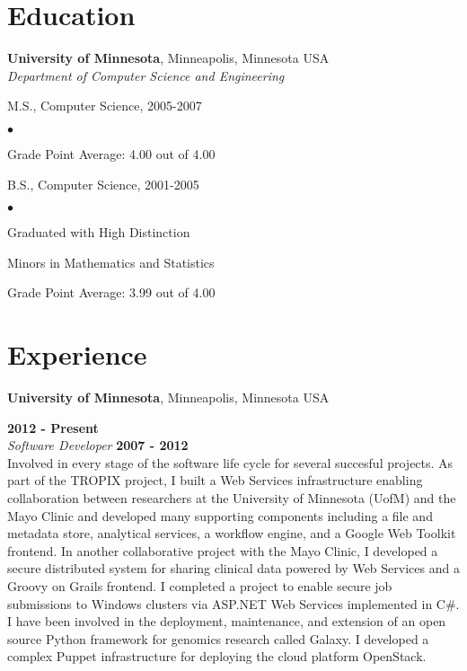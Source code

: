 \documentclass[margin,line]{res}
\newenvironment{list1}{
  \begin{list}{\ding{113}}{%
      \setlength{\itemsep}{0in}
      \setlength{\parsep}{0in} \setlength{\parskip}{0in}
      \setlength{\topsep}{0in} \setlength{\partopsep}{0in} 
      \setlength{\leftmargin}{0.17in}}}{\end{list}}
\newenvironment{list2}{
  \begin{list}{$\bullet$}{%
      \setlength{\itemsep}{0in}
      \setlength{\parsep}{0in} \setlength{\parskip}{0in}
      \setlength{\topsep}{0in} \setlength{\partopsep}{0in} 
      \setlength{\leftmargin}{0.2in}}}{\end{list}}
\begin{document}
\begin{resume}
\section{\sc Education}
{\bf University of Minnesota}, Minneapolis, Minnesota USA\\
{\em Department of Computer Science and Engineering} 
\vspace*{.1in}
\begin{list1}
\item[] M.S., Computer Science, 2005-2007
\begin{list2}
\item Grade Point Average: 4.00 out of 4.00
\end{list2}
\end{list1}
\vspace*{.1in}
\begin{list1}
\item[] B.S., Computer Science,  2001-2005
\begin{list2}
\item Graduated with High Distinction
\item Minors in Mathematics and Statistics
\item Grade Point Average: 3.99 out of 4.00
\end{list2}
\end{list1}


{\section{\sc Experience}}
{\bf University of Minnesota}, Minneapolis, Minnesota USA

\vspace{-.3cm}
\vspace{-.1cm}{\em Senior Software Developer} \hfill {\bf 2012 - Present}\\
{\em Software Developer} \hfill {\bf 2007 - 2012}\\
Involved in every stage of the software life cycle for several succesful projects. As part of the TROPIX
project, I built a Web Services infrastructure enabling collaboration between researchers at the
University of Minnesota (UofM) and the Mayo Clinic and developed many supporting components
including a file and metadata store, analytical services, a workflow engine, and a Google Web Toolkit
frontend. In another collaborative project with the Mayo Clinic, I developed a secure distributed
system for sharing clinical data powered by Web Services and a Groovy on Grails frontend. I
completed a project to enable secure job submissions to Windows clusters via ASP.NET Web Services
implemented in C\#. I have been involved in the deployment, maintenance, and extension of an open
source Python framework for genomics research called Galaxy. I developed a complex Puppet infrastructure 
for deploying the cloud platform OpenStack.


\end{resume}
\end{document}
